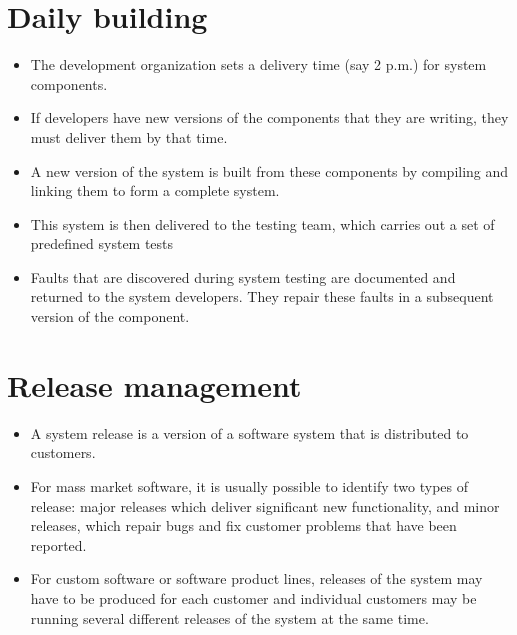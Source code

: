 \section{Daily building}
\begin{itemize}

\item The development organization sets a delivery time (say 2 p.m.) for system components.

   \item If developers have new versions of the components that they are writing, they must deliver them by that time.
   \item A new version of the system is built from these components by compiling and linking them to form a complete system.
   \item This system is then delivered to the testing team, which carries out a set of predefined system tests
   \item Faults that are discovered during system testing are documented and returned to the system developers. They repair these faults in a subsequent version of the component.

\end{itemize}
\section{Release management}
\begin{itemize}

\item A system release is a version of a software system that is distributed to customers.

\item For mass market software, it is usually possible to identify two types of release: major releases which deliver significant new functionality, and minor releases, which repair bugs and fix customer problems that have been reported.

\item For custom software or software product lines, releases of the system may have to be produced for each customer and individual customers may be running several different releases of the system at the same time.
\end{itemize}
